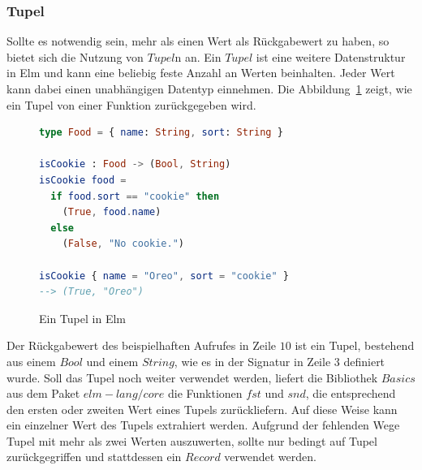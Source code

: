 \subsubsection{Tupel}
\label{sec:Tupel}
Sollte es notwendig sein, mehr als einen Wert als Rückgabewert zu haben, so bietet sich die Nutzung von $Tupel$n an. Ein $Tupel$ ist eine weitere Datenstruktur in Elm und kann eine beliebig feste Anzahl an Werten beinhalten. Jeder Wert kann dabei einen unabhängigen Datentyp einnehmen. Die Abbildung~\ref{fig:elm-tupel} zeigt, wie ein Tupel von einer Funktion zurückgegeben wird.
\begin{figure}[h]
\begin{lstlisting}[language=Elm]
type Food = { name: String, sort: String }

isCookie : Food -> (Bool, String)
isCookie food =
  if food.sort == "cookie" then
    (True, food.name)
  else
    (False, "No cookie.")

isCookie { name = "Oreo", sort = "cookie" }
--> (True, "Oreo")
\end{lstlisting}
\caption{Ein Tupel in Elm}\label{fig:elm-tupel}
\end{figure}
Der Rückgabewert des beispielhaften Aufrufes in Zeile $10$ ist ein Tupel, bestehend aus einem $Bool$ und einem $String$, wie es in der Signatur in Zeile $3$ definiert wurde. Soll das Tupel noch weiter verwendet werden, liefert die Bibliothek $Basics$ aus dem Paket $elm-lang/core$ die Funktionen $fst$ und $snd$, die entsprechend den ersten oder zweiten Wert eines Tupels zurückliefern. Auf diese Weise kann ein einzelner Wert des Tupels extrahiert werden. Aufgrund der fehlenden Wege Tupel mit mehr als zwei Werten auszuwerten, sollte nur bedingt auf Tupel zurückgegriffen und stattdessen ein $Record$ verwendet werden.

